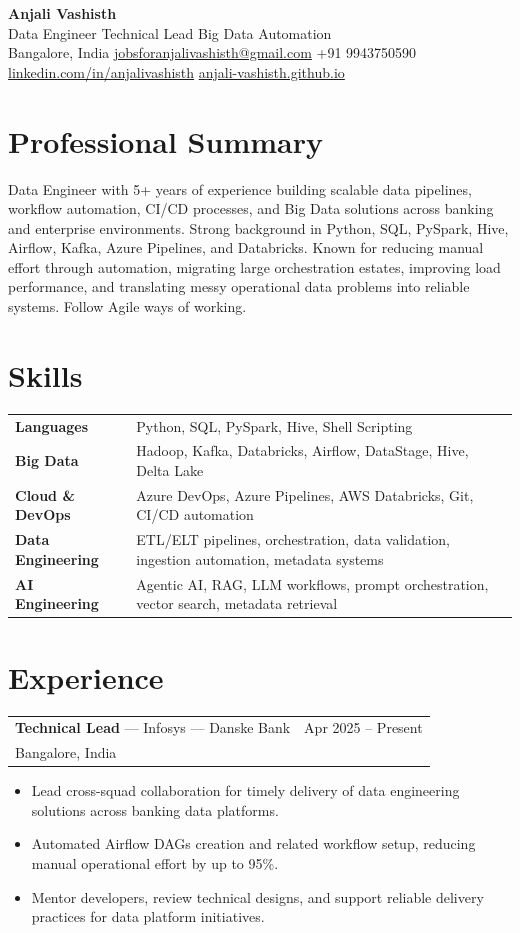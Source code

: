 \documentclass[10pt,letterpaper]{article}
\newcommand{\role}[4]{
  \begin{tabularx}{\textwidth}{X r}
    \textbf{#1} --- #2 & \textcolor{muted}{#3} \\
    \textcolor{muted}{#4} & \\
  \end{tabularx}
  \vspace{-0.85em}
}
\begin{document}
{\Huge \textbf{Anjali Vashisth}}\\[-0.1em]
{\large Data Engineer \textbar{} Technical Lead \textbar{} Big Data Automation}\\[0.35em]
Bangalore, India \quad
\href{mailto:jobsforanjalivashisth@gmail.com}{jobsforanjalivashisth@gmail.com} \quad
+91 9943750590 \quad
\href{https://www.linkedin.com/in/anjalivashisth}{linkedin.com/in/anjalivashisth} \quad
\href{https://anjali-vashisth.github.io/}{anjali-vashisth.github.io}

\section*{Professional Summary}
Data Engineer with 5+ years of experience building scalable data pipelines, workflow automation, CI/CD processes, and Big Data solutions across banking and enterprise environments. Strong background in Python, SQL, PySpark, Hive, Airflow, Kafka, Azure Pipelines, and Databricks. Known for reducing manual effort through automation, migrating large orchestration estates, improving load performance, and translating messy operational data problems into reliable systems. Follow Agile ways of working. 

\section*{Skills}
\begin{tabularx}{\textwidth}{@{}l X@{}}
\textbf{Languages} &  Python, SQL, PySpark, Hive, Shell Scripting \\
\textbf{Big Data} &  Hadoop, Kafka, Databricks, Airflow, DataStage, Hive, Delta Lake \\
\textbf{Cloud \& DevOps} &  Azure DevOps, Azure Pipelines, AWS Databricks, Git, CI/CD automation \\
\textbf{Data Engineering} &  ETL/ELT pipelines, orchestration, data validation, ingestion automation, metadata systems \\
\textbf{AI Engineering} &  Agentic AI, RAG, LLM workflows, prompt orchestration, vector search, metadata retrieval \\
\end{tabularx}

\section*{Experience}
\role{Technical Lead}{Infosys --- Danske Bank}{Apr 2025 -- Present}{Bangalore, India}
\begin{itemize}
  \item Lead cross-squad collaboration for timely delivery of data engineering solutions across banking data platforms.
  \item Automated Airflow DAGs creation and related workflow setup, reducing manual operational effort by up to 95\%.
  \item Mentor developers, review technical designs, and support reliable delivery practices for data platform initiatives.
\end{itemize}
\end{document}
